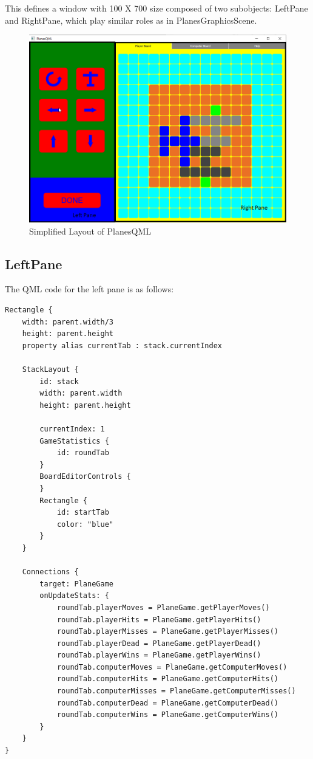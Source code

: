 This defines a window with 100 X 700 size composed of two subobjects: LeftPane and RightPane, which play similar roles as in PlanesGraphicsScene.

\begin{figure}[h]
	\includegraphics[width = \textwidth]{PlanesQML_BoardEditing_WidgetNames.png}
	\caption{Simplified Layout of PlanesQML}
	\label{fig:planesqml_boardediting_widgetnames}
\end{figure}

\subsection {LeftPane}

The QML code for the left pane is as follows:

\begin{lstlisting}
Rectangle {
	width: parent.width/3
	height: parent.height
	property alias currentTab : stack.currentIndex
	
	StackLayout {
		id: stack
		width: parent.width
		height: parent.height
		
		currentIndex: 1
		GameStatistics {
			id: roundTab
		}
		BoardEditorControls {
		}
		Rectangle {
			id: startTab
			color: "blue"
		}
	}
	
	Connections {
		target: PlaneGame
		onUpdateStats: {
			roundTab.playerMoves = PlaneGame.getPlayerMoves()
			roundTab.playerHits = PlaneGame.getPlayerHits()
			roundTab.playerMisses = PlaneGame.getPlayerMisses()
			roundTab.playerDead = PlaneGame.getPlayerDead()
			roundTab.playerWins = PlaneGame.getPlayerWins()
			roundTab.computerMoves = PlaneGame.getComputerMoves()
			roundTab.computerHits = PlaneGame.getComputerHits()
			roundTab.computerMisses = PlaneGame.getComputerMisses()
			roundTab.computerDead = PlaneGame.getComputerDead()
			roundTab.computerWins = PlaneGame.getComputerWins()
		}
	}
}
\end{lstlisting}

